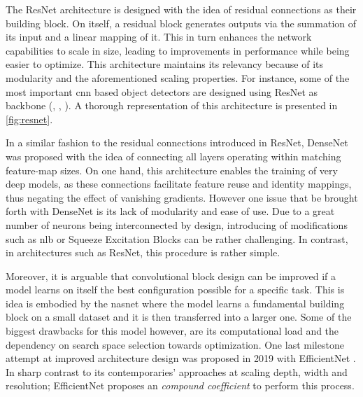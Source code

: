 

%
\noindent The ResNet architecture is designed with the idea of residual connections as their 
building block. On itself, a residual block generates outputs via the summation of its input and a 
linear mapping of it. This in turn enhances the network capabilities to scale in size, leading to 
improvements in performance while being easier to optimize. This architecture maintains its 
relevancy because of its modularity and the aforementioned scaling properties. For instance, some 
of the most important \gls{cnn} based object detectors are designed using ResNet as backbone 
(\cite{ren2015faster}, \cite{lin2017focal}, \cite{he2017mask}). A thorough representation of this 
architecture is presented in \autoref{fig:resnet}. 

In a similar fashion to the residual connections introduced in ResNet, DenseNet 
\autocite{huang2017densely} was proposed with the idea of connecting all layers operating within 
matching feature-map sizes. On one hand, this architecture enables the training of very deep 
models, as these connections facilitate feature reuse and identity mappings, thus negating the 
effect of vanishing gradients. However one issue that be brought forth with DenseNet is its 
lack of  modularity and ease of use. Due to a great number of neurons being interconnected by 
design, introducing of modifications such as \gls{nlb}\autocite{wang2018non} or Squeeze Excitation 
Blocks  \autocite{hu2018squeeze} can be  rather challenging. In contrast, in architectures such as 
ResNet, this procedure is rather simple.

Moreover, it is arguable that convolutional block design can be improved if a model learns on 
itself the best configuration possible for a specific task. This is idea is embodied by the 
\gls{nasnet} \autocite{zoph2018learning} where the model learns a fundamental building block on a 
small dataset and it is then transferred into a larger one. Some of the biggest drawbacks for this 
model however, are its computational load and the dependency on search space selection towards 
optimization. One last milestone attempt at improved architecture design was proposed in 2019 with 
EfficientNet \autocite{tan2019efficientnet}. In sharp contrast to its contemporaries' approaches at 
scaling depth, width and resolution; EfficientNet proposes an \emph{compound coefficient} to 
perform this process.

